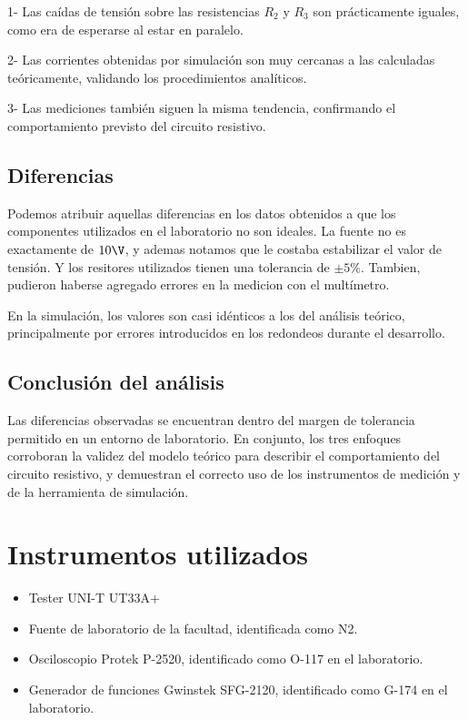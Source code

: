 \documentclass[]{informeutn}
\begin{document}
1- Las caídas de tensión sobre las resistencias $R_2$ y $R_3$ son prácticamente iguales, como era de esperarse al estar en paralelo.

2- Las corrientes obtenidas por simulación son muy cercanas a las calculadas teóricamente, validando los procedimientos analíticos.

3- Las mediciones también siguen la misma tendencia, confirmando el comportamiento previsto del circuito resistivo.

\subsection*{Diferencias}
Podemos atribuir aquellas diferencias en los datos obtenidos a que los componentes utilizados en el laboratorio no son ideales.
La fuente no es exactamente de $10\V$, y ademas notamos que le costaba estabilizar el valor de tensión. Y los resitores utilizados
tienen una tolerancia de $\pm5\percent$. Tambien, pudieron haberse agregado errores en la medicion con el multímetro.

En la simulación, los valores son casi idénticos a los del análisis teórico, principalmente por errores introducidos en los redondeos
durante el desarrollo.

\subsection*{Conclusión del análisis}

Las diferencias observadas se encuentran dentro del margen de tolerancia permitido en un entorno de laboratorio. En
conjunto, los tres enfoques corroboran la validez del modelo teórico para describir el comportamiento del circuito
resistivo, y demuestran el correcto uso de los instrumentos de medición y de la herramienta de simulación.

\section{Instrumentos utilizados}
\begin{itemize}
  \item Tester UNI-T UT33A+
  \item Fuente de laboratorio de la facultad, identificada como N2.
  \item Osciloscopio Protek P-2520, identificado como O-117 en el laboratorio.
  \item Generador de funciones Gwinstek SFG-2120, identificado como G-174 en el laboratorio.
\end{itemize}
\end{document}

